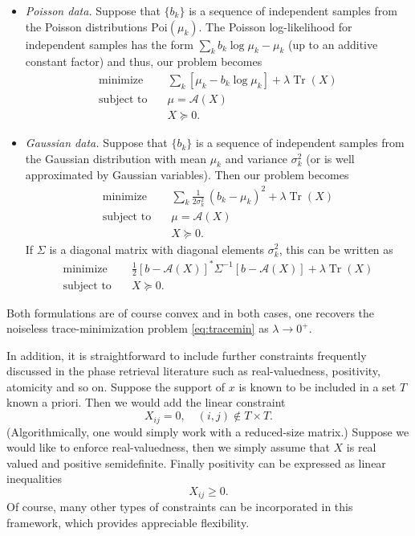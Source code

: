 \documentclass[11pt]{article}
\newcommand{\<}{\langle}
\renewcommand{\>}{\rangle}
\newcommand{\cA}{\mathcal{A}}
\newcommand{\trace}{\operatorname{Tr}}
\numberwithin{equation}{section}
\begin{document}
\begin{itemize}
\item {\em Poisson data.} Suppose that $\{b_k\}$ is a sequence of
  independent samples from the Poisson distributions
  $\text{Poi}(\mu_k)$.  The Poisson log-likelihood for independent
  samples has the form $\sum_k b_k \log \mu_k - \mu_k$ (up to an
  additive constant factor) and thus, our problem becomes
\[
\begin{array}{ll}
  \text{minimize}   & \quad \sum_k  [\mu_k - b_k \log \mu_k] + \lambda \trace(X)\\ 
  \text{subject to} & \quad  \mu = \cA(X)\\
  & \quad X \succeq 0. 
\end{array}
\]
\item {\em Gaussian data.}  Suppose that $\{b_k\}$ is a sequence of
  independent samples from the Gaussian distribution with mean $\mu_k$
  and variance $\sigma_k^2$ (or is well approximated by Gaussian
  variables). Then our problem becomes
\[
\begin{array}{ll}
  \text{minimize}   & \quad \sum_k  \frac{1}{2\sigma^2_k} \, (b_k - \mu_k)^2 + 
  \lambda \trace(X)\\ 
  \text{subject to} & \quad  \mu = \cA(X)\\
  & \quad X \succeq 0. 
\end{array}
\]
If $\Sigma$ is a diagonal matrix with diagonal elements $\sigma_k^2$,
this can be written as
\[
\begin{array}{ll}
  \text{minimize}   & \quad \frac12 [b - \cA(X)]^* \Sigma^{-1} [b - \cA(X)]  + 
  \lambda \trace(X)\\ 
  \text{subject to} & \quad X \succeq 0. 
\end{array}
\]
\end{itemize}
Both formulations are of course convex and in both cases, one recovers
the noiseless trace-minimization problem \eqref{eq:tracemin} as
$\lambda \rightarrow 0^+$.

In addition, it is straightforward to include further constraints
frequently discussed in the phase retrieval literature such as
real-valuedness, positivity, atomicity and so on. Suppose the support
of $x$ is known to be included in a set $T$ known a priori. Then we
would add the linear constraint
\[
X_{ij} = 0, \quad (i,j) \notin T \times T. 
\]
(Algorithmically, one would simply work with a reduced-size matrix.)
Suppose we would like to enforce real-valuedness, then we simply
assume that $X$ is real valued and positive semidefinite. Finally
positivity can be expressed as linear inequalities
\[
X_{ij} \ge 0. 
\]
Of course, many other types of constraints can be incorporated in this
framework, which provides appreciable flexibility.
\end{document}
